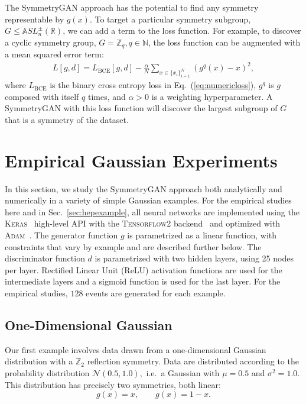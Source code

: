 \documentclass[aps,prx,reprint,preprintnumbers,superscriptaddress,nofootinbib,longbibliography,floatfix]{revtex4-1}
\newcommand{\A}{\mathbb{A}}
\newcommand{\R}{\mathbb{R}}
\newcommand{\Z}{\mathbb{Z}}
\DeclareRobustCommand{\Sec}[1]{Sec.~\ref{sec:#1}}
\DeclareRobustCommand{\Eq}[1]{Eq.~(\ref{eq:#1})}
\begin{document}
The SymmetryGAN approach has the potential to find any symmetry representable by $g(x)$.
%
To target a particular symmetry subgroup, $G \leq \A SL_n^\pm(\R)$, we can add a term to the loss function.
%
For example, to discover a cyclic symmetry group, $G = \Z_q, q\in\mathbb N$, the loss function can be augmented with a mean squared error term:
%
\begin{align}
\label{eq:cyclicloss}
    L[g,d] = L_\text{BCE}[g,d]-\frac\alpha N\sum_{x\in\{x_i\}_{i=1}^N}(g^q(x) - x)^2,
\end{align}
where $L_\text{BCE}$ is the binary cross entropy loss in \Eq{numericloss}, $g^q$ is $g$ composed with itself $q$ times, and $\alpha>0$ is a weighting hyperparameter.
%
A SymmetryGAN with this loss function will discover the largest subgroup of $G$ that is a symmetry of the dataset.


\section{Empirical Gaussian Experiments}
\label{sec:results}

In this section, we study the SymmetryGAN approach both analytically and numerically in a variety of simple Gaussian examples.
%
For the empirical studies here and in \Sec{hepexample}, all neural networks are implemented using the \textsc{Keras}~\cite{keras} high-level API with the \textsc{Tensorflow2} backend~\cite{tensorflow} and optimized with \textsc{Adam}~\cite{adam}.
%
The generator function $g$ is parametrized as a linear function, with constraints that vary by example and are described further below.
%
The discriminator function $d$ is parametrized with two hidden layers, using 25 nodes per layer.
%
Rectified Linear Unit (ReLU) activation functions are used for the intermediate layers and a sigmoid function is used for the last layer.
%
For the empirical studies, $128$ events are generated for each example.

\subsection{One-Dimensional Gaussian}
\label{sec:1d_example}

Our first example involves data drawn from a one-dimensional Gaussian distribution with a $\mathbb{Z}_2$ reflection symmetry.
%
Data are distributed according to the probability distribution $\mathcal N(0.5, 1.0),$ i.e.\ a Gaussian with $\mu = 0.5$ and $\sigma^2 = 1.0$.
%
This distribution has precisely two symmetries, both linear:
\begin{equation}
\label{eq:1D_minima}
g(x) = x, \qquad g(x) = 1-x.
\end{equation}
\end{document}
